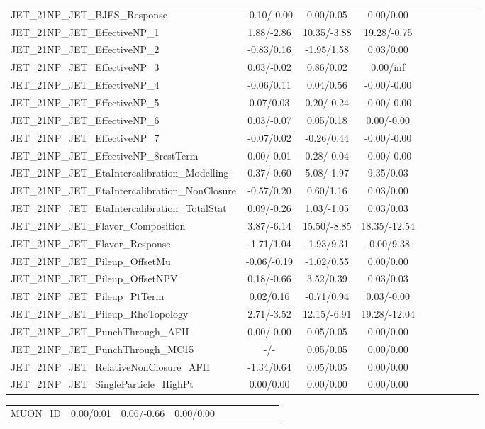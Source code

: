 \begin{table}[h]
\begin{center}
\begin{tabular}{l|ccccccccc}
JET\_21NP\_JET\_BJES\_Response &-0.10/-0.00 &0.00/0.05 &0.00/0.00 \\
JET\_21NP\_JET\_EffectiveNP\_1 &1.88/-2.86 &10.35/-3.88 &19.28/-0.75 \\
JET\_21NP\_JET\_EffectiveNP\_2 &-0.83/0.16 &-1.95/1.58 &0.03/0.00 \\
JET\_21NP\_JET\_EffectiveNP\_3 &0.03/-0.02 &0.86/0.02 &0.00/inf \\
JET\_21NP\_JET\_EffectiveNP\_4 &-0.06/0.11 &0.04/0.56 &-0.00/-0.00 \\
JET\_21NP\_JET\_EffectiveNP\_5 &0.07/0.03 &0.20/-0.24 &-0.00/-0.00 \\
JET\_21NP\_JET\_EffectiveNP\_6 &0.03/-0.07 &0.05/0.18 &0.00/-0.00 \\
JET\_21NP\_JET\_EffectiveNP\_7 &-0.07/0.02 &-0.26/0.44 &-0.00/-0.00 \\
JET\_21NP\_JET\_EffectiveNP\_8restTerm &0.00/-0.01 &0.28/-0.04 &-0.00/-0.00 \\
JET\_21NP\_JET\_EtaIntercalibration\_Modelling &0.37/-0.60 &5.08/-1.97 &9.35/0.03 \\
JET\_21NP\_JET\_EtaIntercalibration\_NonClosure &-0.57/0.20 &0.60/1.16 &0.03/0.00 \\
JET\_21NP\_JET\_EtaIntercalibration\_TotalStat &0.09/-0.26 &1.03/-1.05 &0.03/0.03 \\
JET\_21NP\_JET\_Flavor\_Composition &3.87/-6.14 &15.50/-8.85 &18.35/-12.54 \\
JET\_21NP\_JET\_Flavor\_Response &-1.71/1.04 &-1.93/9.31 &-0.00/9.38 \\
JET\_21NP\_JET\_Pileup\_OffsetMu &-0.06/-0.19 &-1.02/0.55 &0.00/0.00 \\
JET\_21NP\_JET\_Pileup\_OffsetNPV &0.18/-0.66 &3.52/0.39 &0.03/0.03 \\
JET\_21NP\_JET\_Pileup\_PtTerm &0.02/0.16 &-0.71/0.94 &0.03/-0.00 \\
JET\_21NP\_JET\_Pileup\_RhoTopology &2.71/-3.52 &12.15/-6.91 &19.28/-12.04 \\
JET\_21NP\_JET\_PunchThrough\_AFII &0.00/-0.00 &0.05/0.05 &0.00/0.00 \\
JET\_21NP\_JET\_PunchThrough\_MC15 &-/- &0.05/0.05 &0.00/0.00 \\
JET\_21NP\_JET\_RelativeNonClosure\_AFII &-1.34/0.64 &0.05/0.05 &0.00/0.00 \\
JET\_21NP\_JET\_SingleParticle\_HighPt &0.00/0.00 &0.00/0.00 &0.00/0.00 \\
\hline \end{tabular} \end{center} \end{table} \begin{table}[h] \scriptsize \begin{center} \begin{tabular}{l|ccccccccc} \hline MUON\_ID &0.00/0.01 &0.06/-0.66 &0.00/0.00 \\

\end{tabular}
\end{center}
\end{table}
